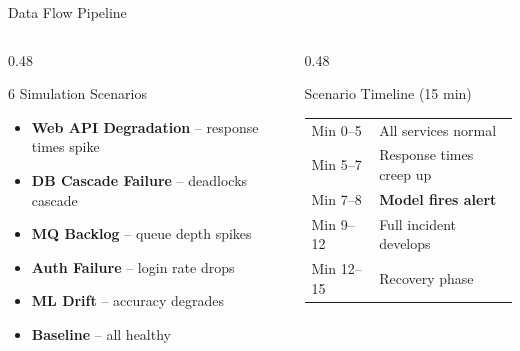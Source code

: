 \documentclass[aspectratio=169,11pt]{beamer}
\begin{document}
\begin{frame}[shrink=4]{Data Flow Pipeline}
\vspace{0.6em}
\begin{columns}[T]
\begin{column}{0.48\textwidth}
\begin{block}{6 Simulation Scenarios}
{\small
\begin{itemize}
    \item \textbf{Web API Degradation} -- response times spike
    \item \textbf{DB Cascade Failure} -- deadlocks cascade
    \item \textbf{MQ Backlog} -- queue depth spikes
    \item \textbf{Auth Failure} -- login rate drops
    \item \textbf{ML Drift} -- accuracy degrades
    \item \textbf{Baseline} -- all healthy
\end{itemize}
}
\end{block}
\end{column}
\begin{column}{0.48\textwidth}
\begin{block}{Scenario Timeline (15 min)}
{\small
\begin{tabular}{ll}
Min 0--5 & All services normal \\
Min 5--7 & Response times creep up \\
Min 7--8 & \textbf{Model fires alert} \\
Min 9--12 & Full incident develops \\
Min 12--15 & Recovery phase \\
\end{tabular}
}
\end{block}
\end{column}
\end{columns}
\end{frame}
\end{document}
